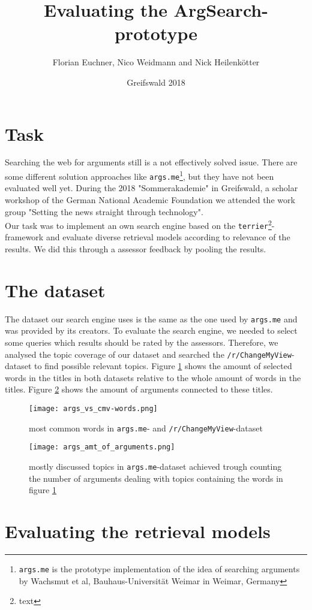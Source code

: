 \documentclass{scrartcl}
\begin{document}
	\title{Evaluating the ArgSearch-prototype}
	\author{Florian Euchner, Nico Weidmann and Nick Heilenkötter}
	\date{Greifswald 2018}
	\maketitle
	
	\section{Task}
	Searching the web for arguments still is a not effectively solved issue. There are some different solution approaches like \texttt{args.me}\footnote{\texttt{args.me} is the prototype implementation of the idea of searching arguments by Wachsmut et al, Bauhaus-Universität Weimar in Weimar, Germany}, but they have not been evaluated well yet. During the 2018 "Sommerakademie" in Greifswald, a scholar workshop of the German National Academic Foundation we attended the work group "Setting the news straight through technology".\\
	Our task was to implement an own search engine based on the \texttt{terrier}\footnote{text}-framework and evaluate diverse retrieval models according to relevance of the results. We did this through a assessor feedback by pooling the results.
	
	\section{The dataset}
	The dataset our search engine uses is the same as the one used by \texttt{args.me} and was provided by its creators.
	To evaluate the search engine, we needed to select some queries which results should be rated by the assessors. Therefore, we analysed the topic coverage of our dataset and  searched the \texttt{/r/ChangeMyView}-dataset to find possible relevant topics. Figure \ref{fig:common_words} shows the amount of selected  words in the titles in both datasets relative to the whole amount of words in the titles. Figure \ref{fig:common_words_arguments} shows the amount of arguments connected to these titles.
	
	\begin{figure}[hpbt]
	\centering
	\texttt{[image: args\_vs\_cmv-words.png]}
	\caption{most common words in \texttt{args.me}- and \texttt{/r/ChangeMyView}-dataset}
	\label{fig:common_words}
	\end{figure}

	\begin{figure}[hpbt]
	\centering
	\texttt{[image: args\_amt\_of\_arguments.png]}
	\caption{mostly discussed topics in \texttt{args.me}-dataset achieved trough counting the number of arguments dealing with topics containing the words in figure \ref{fig:common_words}}
	\label{fig:common_words_arguments}
	\end{figure}

	\section{Evaluating the retrieval models}
	
	
\end{document}
